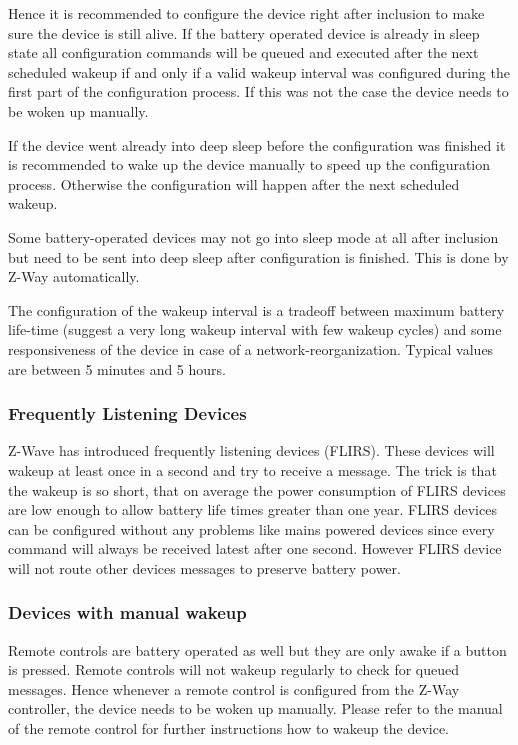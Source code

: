 Hence it is recommended to configure the device right after inclusion to make sure the device is still 
alive. If the battery operated device is already in sleep state all configuration commands will be 
queued and executed after the next scheduled wakeup if and only if a valid wakeup interval was configured 
during the first part of the configuration process. If this was not the case the device needs to be woken 
up manually.

If the device went already into deep sleep before the configuration was finished it is recommended to 
wake up the device manually to speed up the configuration process. Otherwise the configuration will happen 
after the next scheduled wakeup.

Some battery-operated devices may not go into sleep mode at all after inclusion but need to be sent into 
deep sleep after configuration is finished. This is done by Z-Way automatically.

The configuration of the wakeup interval is a tradeoff between maximum battery life-time  (suggest a 
very long wakeup interval with few wakeup cycles) and some responsiveness of the device in case of a 
network-reorganization. Typical values are between 5 minutes and 5 hours.

\subsubsection{Frequently Listening Devices}

Z-Wave has introduced frequently listening devices (FLIRS). These devices will wakeup at least once in 
a second and try to receive a message. The trick is that the wakeup is so short, that on average the power 
consumption of FLIRS devices are low enough to allow battery life times greater than one year. FLIRS 
devices can be configured without any problems like mains powered devices since every command will 
always be received latest after one second.
However FLIRS device will not route other devices messages to preserve battery power.

\subsubsection{Devices with manual wakeup}

Remote controls are battery operated as well but they are only awake if a button is pressed. Remote 
controls will not wakeup regularly to check for queued messages. Hence whenever a remote control is 
configured from the Z-Way controller, the device needs to be woken up manually. Please refer to the 
manual of the remote control for further instructions how to wakeup the device.  


 